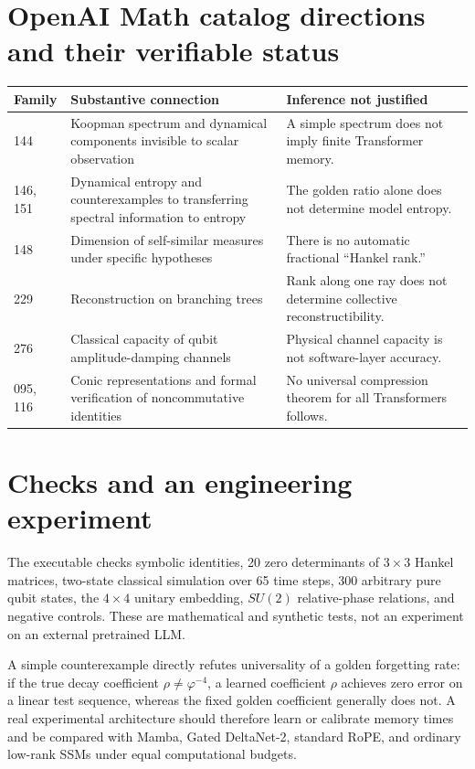 \documentclass[11pt,a4paper,oneside]{book}
\begin{document}
\section*{OpenAI Math catalog directions and their verifiable status}
\begin{longtable}{p{}p{}p{}}
\toprule Family&Substantive connection&Inference not justified\\\midrule
144&Koopman spectrum and dynamical components invisible to scalar observation&A simple spectrum does not imply finite Transformer memory.\\
146, 151&Dynamical entropy and counterexamples to transferring spectral information to entropy&The golden ratio alone does not determine model entropy.\\
148&Dimension of self-similar measures under specific hypotheses&There is no automatic fractional ``Hankel rank.''\\
229&Reconstruction on branching trees&Rank along one ray does not determine collective reconstructibility.\\
276&Classical capacity of qubit amplitude-damping channels&Physical channel capacity is not software-layer accuracy.\\
095, 116&Conic representations and formal verification of noncommutative identities&No universal compression theorem for all Transformers follows.\\\bottomrule
\end{longtable}
\section*{Checks and an engineering experiment}
The executable  checks symbolic identities, 20 zero determinants of $3\times3$ Hankel matrices, two-state classical simulation over 65 time steps, 300 arbitrary pure qubit states, the $4\times4$ unitary embedding, $SU(2)$ relative-phase relations, and negative controls. These are mathematical and synthetic tests, not an experiment on an external pretrained LLM.

A simple counterexample directly refutes universality of a golden forgetting rate: if the true decay coefficient $\rho\ne\varphi^{-4}$, a learned coefficient $\rho$ achieves zero error on a linear test sequence, whereas the fixed golden coefficient generally does not. A real experimental architecture should therefore learn or calibrate memory times and be compared with Mamba, Gated DeltaNet-2, standard RoPE, and ordinary low-rank SSMs under equal computational budgets.
\end{document}

